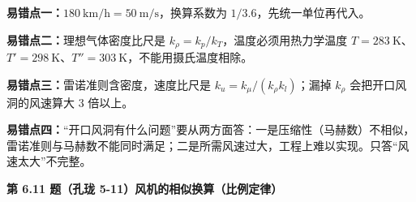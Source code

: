 \begin{yicuo}
\textbf{易错点一：}$180\ \mathrm{km/h}=50\ \mathrm{m/s}$，换算系数为 $1/3.6$，先统一单位再代入。

\textbf{易错点二：}理想气体密度比尺是 $k_\rho=k_p/k_T$，温度必须用热力学温度 $T=283\ \mathrm{K}$、$T'=298\ \mathrm{K}$、$T''=303\ \mathrm{K}$，不能用摄氏温度相除。

\textbf{易错点三：}雷诺准则含密度，速度比尺是 $k_u=k_\mu/(k_\rho k_l)$；漏掉 $k_\rho$ 会把开口风洞的风速算大 3 倍以上。

\textbf{易错点四：}“开口风洞有什么问题”要从两方面答：一是压缩性（马赫数）不相似，雷诺准则与马赫数不能同时满足；二是所需风速过大，工程上难以实现。只答“风速太大”不完整。
\end{yicuo}

\noindent\textbf{第 6.11 题（孔珑 5-11）\quad 风机的相似换算（比例定律）}

